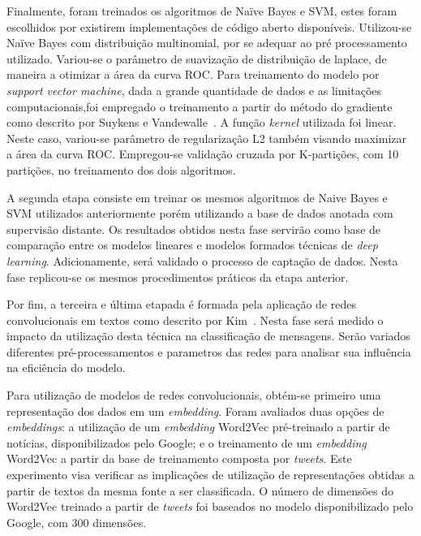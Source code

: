 Finalmente, foram treinados os algoritmos de Naïve Bayes e SVM, estes foram escolhidos por existirem implementações de
código aberto disponíveis.
Utilizou-se Naïve Bayes com distribuição multinomial, por se adequar ao pré processamento utilizado.
Variou-se o parâmetro de suavização de distribuição de laplace, de maneira a otimizar a área da curva ROC.
Para treinamento do modelo por \textit{support vector machine}, dada a grande quantidade de dados e as limitações
computacionais,foi empregado o treinamento a partir do método do gradiente como descrito por Suykens e
Vandewalle~\cite{suykens99}.
A função \textit{kernel} utilizada foi linear.
Neste caso, variou-se parâmetro de regularização L2 também visando maximizar a área da curva ROC.
Empregou-se validação cruzada por K-partições, com 10 partições, no treinamento dos dois algoritmos.

A segunda etapa consiste em treinar os mesmos algoritmos de Naive Bayes e SVM utilizados anteriormente porém utilizando
a base de dados anotada com supervisão distante.
Os resultados obtidos nesta fase servirão como base de comparação entre os modelos lineares e modelos formados técnicas
de \textit{deep learning}.
Adicionamente, será validado o processo de captação de dados.
Nesta fase replicou-se os mesmos procedimentos práticos da etapa anterior.

Por fim, a terceira e última etapada é formada pela aplicação de redes convolucionais em textos como descrito por
Kim~\cite{kim14}.
Nesta fase será medido o impacto da utilização desta técnica na classificação de mensagens.
Serão variados diferentes pré-processamentos e parametros das redes para analisar sua influência na eficiência do
modelo.

Para utilização de modelos de redes convolucionais, obtém-se primeiro uma representação dos dados em um
\textit{embedding}.
Foram avaliados duas opções de \textit{embeddings}: a utilização de um \textit{embedding} Word2Vec pré-treinado a
partir de notícias, disponibilizados pelo Google; e o treinamento de um \textit{embedding} Word2Vec a partir da base de
treinamento composta por \textit{tweets}.
Este experimento visa verificar as implicações de utilização de representações obtidas a partir de textos da mesma
fonte a ser classificada.
O número de dimensões do Word2Vec treinado a partir de \textit{tweets} foi baseados no modelo disponibilizado pelo
Google, com 300 dimensões.

